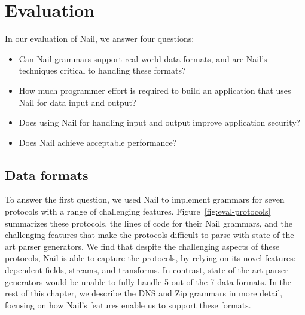 \chapter{Evaluation}
\label{s:eval}



In our evaluation of Nail, we answer four questions:

\begin{itemize}

\item Can Nail grammars support real-world data formats, and
      are Nail's techniques critical to handling these formats?

\item How much programmer effort is required to build an
      application that uses Nail for data input and output?

\item Does using Nail for handling input and output improve
      application security?

\item Does Nail achieve acceptable performance?

\end{itemize}

\section{Data formats}
\label{s:eval-formats}

To answer the first question, we used Nail to implement grammars
for seven protocols with a range of challenging features.
Figure~\ref{fig:eval-protocols} summarizes these protocols, the lines
of code for their Nail grammars, and the challenging features that make
the protocols difficult to parse with state-of-the-art parser generators.
We find that despite the challenging aspects of these protocols, Nail is
able to capture the protocols, by relying on its novel features: dependent
fields, streams, and transforms.  In contrast, state-of-the-art parser
generators would be unable to fully handle 5 out of the 7 data formats.
In the rest of this chapter, we describe the DNS and Zip grammars in
more detail, focusing on how Nail's features enable us to support these
formats.

